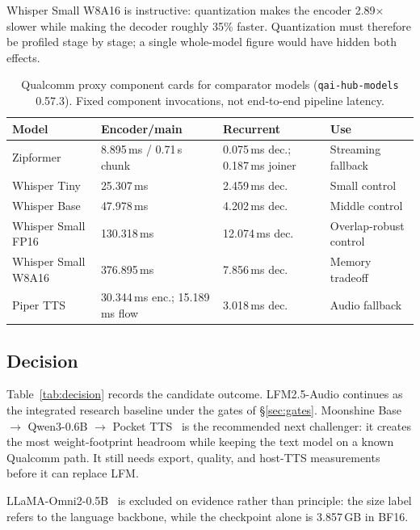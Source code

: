 \documentclass[10pt,twocolumn,letterpaper]{article}
\begin{document}
Whisper Small W8A16 is instructive: quantization makes the encoder
2.89$\times$ slower while making the decoder roughly 35\% faster. Quantization
must therefore be profiled stage by stage; a single whole-model figure would
have hidden both effects.

\begin{table}[t]
\centering
\small
\caption{Qualcomm proxy component cards for comparator models
(\texttt{qai-hub-models} 0.57.3). Fixed component invocations, not end-to-end
pipeline latency.}
\label{tab:comparators}
\begin{tabular}{@{}llll@{}}
\toprule
\textbf{Model} & \textbf{Encoder/main} & \textbf{Recurrent} & \textbf{Use} \\
\midrule
Zipformer & 8.895\,ms / 0.71\,s chunk & 0.075\,ms dec.; 0.187\,ms joiner & Streaming fallback \\
\addlinespace[1pt]
Whisper Tiny & 25.307\,ms & 2.459\,ms dec. & Small control \\
\addlinespace[1pt]
Whisper Base & 47.978\,ms & 4.202\,ms dec. & Middle control \\
\addlinespace[1pt]
Whisper Small FP16 & 130.318\,ms & 12.074\,ms dec. & Overlap-robust control \\
\addlinespace[1pt]
Whisper Small W8A16 & 376.895\,ms & 7.856\,ms dec. & Memory tradeoff \\
\addlinespace[1pt]
Piper TTS & 30.344\,ms enc.; 15.189\,ms flow & 3.018\,ms dec. & Audio fallback \\
\bottomrule
\end{tabular}
\end{table}

\subsection{Decision}

Table~\ref{tab:decision} records the candidate outcome. LFM2.5-Audio continues
as the integrated research baseline under the gates of \S\ref{sec:gates}.
Moonshine Base $\rightarrow$ Qwen3-0.6B $\rightarrow$ Pocket
TTS~\citep{moonshine,qwen3,pocket} is the recommended next challenger: it
creates the most weight-footprint headroom while keeping the text model on a
known Qualcomm path. It still needs export, quality, and host-TTS
measurements before it can replace LFM.

LLaMA-Omni2-0.5B~\citep{llamaomni2} is excluded on evidence rather than
principle: the size label refers to the language backbone, while the
checkpoint alone is 3.857\,GB in BF16.
\end{document}
